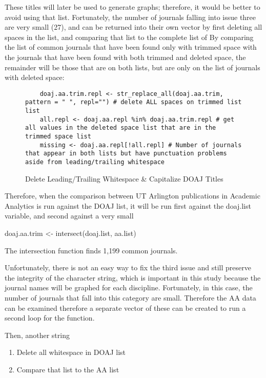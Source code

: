 \documentclass{article}
\begin{document}
These titles will later be used to generate graphs; therefore, it would be better to avoid using that list.
Fortunately, the number of journals falling into issue three are very small (27), and can be returned into their own vector by first deleting all spaces in the list, and comparing that list to the complete list of 
By comparing the list of common journals that have been found only with trimmed space with the journals that have been found with both trimmed and deleted space, the remainder will be those that are on both lists, but are only on the list of journals with deleted space:
\begin{figure}
	\centering
	\begin{lstlisting}
	doaj.aa.trim.repl <- str_replace_all(doaj.aa.trim, pattern = " ", repl="") # delete ALL spaces on trimmed list list
	all.repl <- doaj.aa.repl %in% doaj.aa.trim.repl # get all values in the deleted space list that are in the trimmed space list
	missing <- doaj.aa.repl[!all.repl] # Number of journals that appear in both lists but have punctuation problems aside from leading/trailing whitespace
	\end{lstlisting}
	\caption{Delete Leading/Trailing Whitespace \& Capitalize DOAJ Titles}
\end{figure}

Therefore, when the comparison between UT Arlington publications in Academic Analytics is run against the DOAJ list, it will be run first against the doaj.list variable, and second against a very small 


	doaj.aa.trim <- intersect(doaj.list, aa.list) 




The intersection function finds 1,199 common journals.

Unfortunately, there is not an easy way to fix the third issue and still preserve the integrity of the character string, which is important in this study because the journal names will be graphed for each discipline.
Fortunately, in this case, the number of journals that fall into this category are small.
Therefore the AA data can be examined  therefore a separate vector of these can be created to run a second loop for the function.

Then, another string 
\begin{enumerate}
	\item Delete all whitespace in DOAJ list
	\item Compare that list to the AA list
\end{enumerate}	
\end{document}
